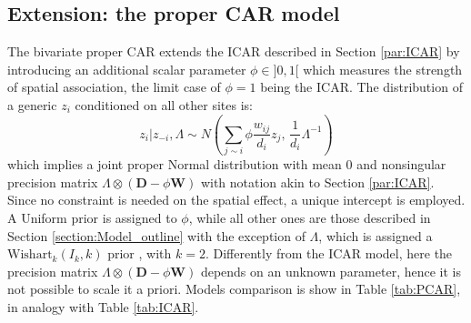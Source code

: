 \documentclass{book}
\begin{document}
\begin{appendices}
\section{Extension: the proper CAR model} \label{Appendix:C}
The bivariate proper CAR \citep{PCAR_Gelfand} extends the ICAR described in Section \ref{par:ICAR} by introducing an additional scalar parameter $\phi \in ]0, 1[$ which measures the strength of spatial association, the limit case of $\phi = 1$ being the ICAR. The distribution of a generic $z_i$ conditioned on all other sites is:
\begin{equation}
z_{i}   |  z_{-i}, \Lambda \sim N \left(\sum_{j \sim i} \phi \frac{w_{ij}}{d_i} z_{j},  \, \frac{1}{d_i} \Lambda^{-1}\right)
\label{eq:PCAR_local}
\end{equation}
which  implies a joint proper Normal distribution with mean $0$ and nonsingular precision matrix $\Lambda \otimes (\mathbf{D} - \phi \mathbf{W})$ with notation akin to Section \ref{par:ICAR}.
%
%
 Since no constraint is needed on the spatial effect, a unique intercept is employed. A Uniform prior is assigned to $\phi$, while all other ones are those described in Section \ref{section:Model_outline} with the exception of $\Lambda$, which is assigned a $\mathrm{Wishart}_k(I_k, k)$ prior \citep{INLAMSM}, with $k=2$. Differently from the ICAR model, here the precision matrix $\Lambda \otimes (\mathbf{D} - \phi \mathbf{W})$ depends on an unknown parameter, hence it is not possible to scale it a priori. Models comparison is show in Table \ref{tab:PCAR}, in analogy with Table \ref{tab:ICAR}. 


\end{appendices}
\end{document}
